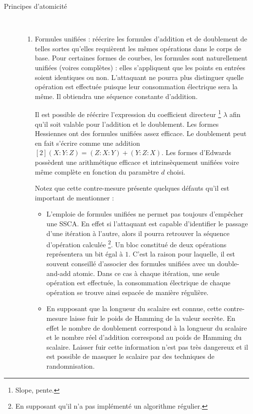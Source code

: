 \begin{description}
    \item[Principes d'atomicité] \hfill \\
    \begin{enumerate}
        \item Formules unifiées : réécrire les formules d'addition et de doublement de telles sortes qu'elles requièrent les mêmes opérations dans le corps de base. Pour certaines formes de courbes, les formules sont naturellement unifiées (voires complètes) : elles s'appliquent que les points en entrées soient identiques ou non. L'attaquant ne pourra plus distinguer quelle opération est effectuée puisque leur consommation électrique sera la même. Il obtiendra une séquence constante d'addition. 
        
        Il est possible de réécrire l'expression du coefficient directeur \footnote{Slope, pente.} $\lambda$ afin qu'il soit valable pour l'addition et le doublement. Les formes Hessiennes ont des formules unifiées assez efficace. Le doublement peut en fait s'écrire comme une addition $[2](X : Y : Z) = (Z : X : Y) + (Y : Z : X)$. Les formes d'Edwards possèdent une arithmétique efficace et intrinsèquement unifiées voire même complète en fonction du paramètre $d$ choisi. 
        
        Notez que cette contre-mesure présente quelques défauts qu'il est important de mentionner :
        \begin{itemize}[label=--]
            \item L'emploie de formules unifiées ne permet pas toujours d'empêcher une SSCA. En effet si l'attaquant est capable d'identifier le passage d'une itération à l'autre, alors il pourra retrouver la séquence d'opération calculée \footnote{En supposant qu'il n'a pas implémenté un algorithme régulier.}. Un bloc constitué de deux opérations représentera un bit égal à $1$. C'est la raison pour laquelle, il est souvent conseillé d'associer des formules unifiées avec un double-and-add atomic. Dans ce cas à chaque itération, une seule opération est effectuée, la consommation électrique de chaque opération se trouve ainsi espacée de manière régulière. 
            \item En supposant que la longueur du scalaire est connue, cette contre-mesure laisse fuir le poids de Hamming de la valeur secrète. En effet le nombre de doublement correspond à la longueur du scalaire et le nombre réel d'addition correspond au poids de Hamming du scalaire. Laisser fuir cette information n'est pas très dangereux et il est possible de masquer le scalaire par des techniques de randomnisation.
        \end{itemize}
        

\end{enumerate}
\end{description}
